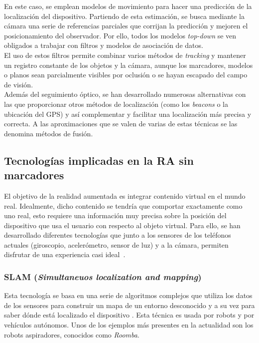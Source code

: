 En este caso, se emplean modelos de movimiento para hacer una predicción de la localización del dispositivo. Partiendo de esta estimación, se busca mediante la cámara una serie de referencias parciales que corrijan la predicción y mejoren el posicionamiento del observador. Por ello, todos los modelos \textit{top-down} se ven obligados a trabajar con filtros y modelos de asociación de datos.\\

El uso de estos filtros permite combinar varios métodos de \textit{tracking} y mantener un registro constante de los objetos y la cámara, aunque los marcadores, modelos o planos sean parcialmente visibles por oclusión o se hayan escapado del campo de visión.\\

Además del seguimiento óptico, se han desarrollado numerosas alternativas con las que proporcionar otros métodos de localización (como los \textit{beacons} o la ubicación del GPS) y así complementar y facilitar una localización más precisa y correcta. A las aproximaciones que se valen de varias de estas técnicas se las denomina métodos de fusión.\\

\subsection{Tecnologías implicadas en la RA sin marcadores}\label{tecnologiasImplicadas}
El objetivo de la realidad aumentada es integrar contenido virtual en el mundo real. Idealmente, dicho contenido se tendría que comportar exactamente como uno real, esto requiere una información muy precisa sobre la posición del dispositivo que usa el usuario con respecto al objeto virtual. Para ello, se han desarrollado diferentes tecnologías que junto a los sensores de los teléfonos actuales (giroscopio, acelerómetro, sensor de luz) y a la cámara, permiten disfrutar de una experiencia casi ideal~\cite{ARCarmigniani}. \\

\subsubsection{SLAM (\textit{Simultaneuos localization and mapping})}\label{SLAMsection}
Esta tecnología se basa en una serie de algoritmos complejos que utiliza los datos de los sensores para construir un mapa de un entorno desconocido y a su vez para saber dónde está localizado el dispositivo  \cite{ARCarmigniani}. Esta técnica es usada por robots y por vehículos autónomos. Unos de los ejemplos más presentes en la actualidad son los robots aspiradores, conocidos como \textit{Roomba}.\\

